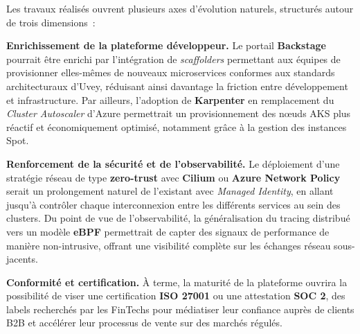 

\medskip
\noindent Les travaux réalisés ouvrent plusieurs axes d'évolution naturels, structurés
autour de trois dimensions~:

\medskip
\noindent \textbf{Enrichissement de la plateforme développeur.} Le portail
\textbf{Backstage} pourrait être enrichi par l'intégration de \textit{scaffolders}
permettant aux équipes de provisionner elles-mêmes de nouveaux microservices conformes
aux standards architecturaux d'Uvey, réduisant ainsi davantage la friction entre
développement et infrastructure. Par ailleurs, l'adoption de \textbf{Karpenter} en
remplacement du \textit{Cluster Autoscaler} d'Azure permettrait un provisionnement des
n\oe{}uds \ac{AKS} plus réactif et économiquement optimisé, notamment grâce à la gestion
des instances Spot.

\medskip
\noindent \textbf{Renforcement de la sécurité et de l'observabilité.} Le déploiement
d'une stratégie réseau de type \textbf{zero-trust} avec \textbf{Cilium} ou \textbf{Azure
Network Policy} serait un prolongement naturel de l'existant avec \textit{Managed
Identity}, en allant jusqu'à contrôler chaque interconnexion entre les différents services
au sein des clusters. Du point de vue de l'observabilité, la généralisation du tracing
distribué vers un modèle \textbf{eBPF} permettrait de capter des signaux de performance
de manière non-intrusive, offrant une visibilité complète sur les échanges réseau
sous-jacents.

\medskip
\noindent \textbf{Conformité et certification.} À terme, la maturité de la plateforme
ouvrira la possibilité de viser une certification \textbf{ISO 27001} ou une attestation
\textbf{SOC 2}, des labels recherchés par les FinTechs pour médiatiser leur confiance
auprès de clients B2B et accélérer leur processus de vente sur des marchés régulés.